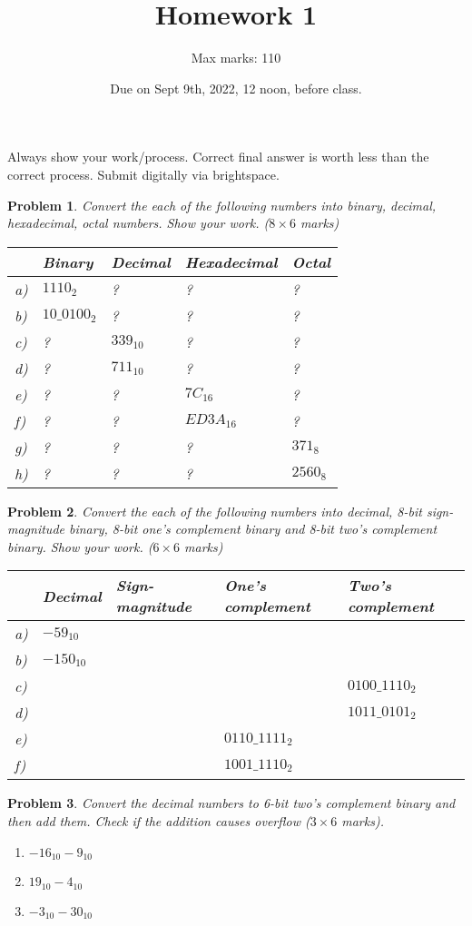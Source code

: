 \documentclass{article}
\title{Homework 1}
\author{Max marks: 110}
\date{Due on Sept 9th, 2022, 12 noon, before class. }
\newtheorem{prob}{Problem}
\begin{document}
\maketitle
Always show your work/process. Correct final answer is worth less than the
correct process. Submit digitally via brightspace.

\begin{prob}
  Convert the each of the following numbers into binary, decimal, hexadecimal,
octal numbers. Show your work. ($8 \times 6 $ marks)

  \begin{tabular}{lllll}
    \toprule
     & Binary & Decimal & Hexadecimal & Octal \\
    \midrule
    a)& $1110_2$     & ? & ? & ?  \\
    b)& $10\_0100_2$ & ? & ? & ? \\
    c)& ? & $339_{10}$   & ? & ? \\
    d)& ? & $711_{10}$   & ? & ? \\
    e)& ? & ? & $7C_{16}$    & ? \\
    f)& ? & ? & $ED3A_{16}$  & ? \\
    g)& ? & ? & ? & $371_8$\\
    h)& ? & ? & ? & $2560_8$\\
    \bottomrule
  \end{tabular}
\end{prob}

\begin{prob}
  Convert the each of the following numbers into decimal, 8-bit sign-magnitude binary,
  8-bit one's complement binary and 8-bit two's complement binary. Show your work. ($6 \times 6 $ marks)

  \begin{tabular}{lllll}
    \toprule
    & Decimal & Sign-magnitude & One's complement & Two's complement \\
    \midrule
    a) & $-59_{10}$ & & & \\
    b) & $-150_{10}$ & & & \\
    c) & & & & $0100\_1110_2$ \\
    d) & &  & & $1011\_0101_2$\\
    e) & & & $0110\_1111_2$&  \\
    f) & &  & $1001\_1110_2$& \\
    \bottomrule
  \end{tabular}
\end{prob}

\begin{prob}
  Convert the decimal numbers to 6-bit two's complement binary and then add
  them. Check if the addition causes overflow ($3 \times 6$ marks).
  \begin{enumerate}
  \item $-16_{10} - 9_{10}$
  \item $19_{10} - 4_{10}$
  \item $-3_{10} - 30_{10}$
  \end{enumerate}
\end{prob}
\end{document}
